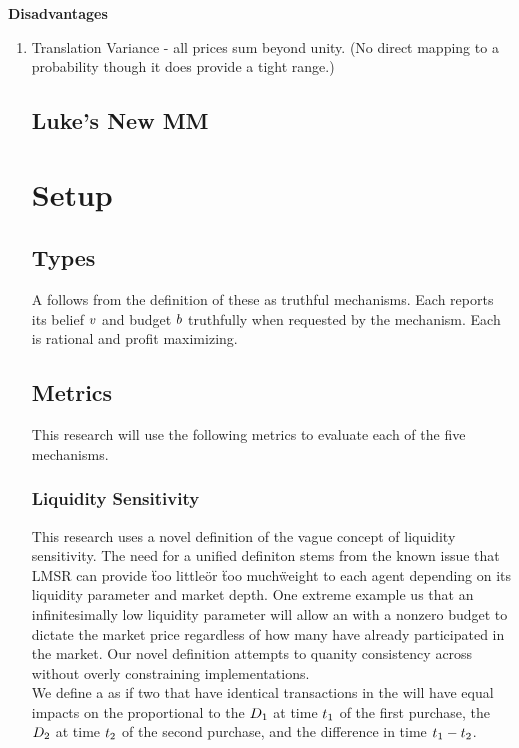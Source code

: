 \textbf{Disadvantages} \\
\begin{enumerate}
\item{Translation Variance - all prices sum beyond unity. (No direct mapping to a probability though it does provide a tight range.)}

\subsection{Luke's New MM}

\section{Setup}

\subsection{Types}
A  follows from the definition of these  as truthful
mechanisms. Each  reports its belief $v$ and budget $b$
truthfully when requested by the mechanism. Each  is rational and profit
maximizing.

\subsection{Metrics}
This research will use the following metrics to evaluate each of the five mechanisms.
\subsubsection{Liquidity Sensitivity}
This research uses a novel definition of the vague concept of liquidity sensitivity. The need
for a unified definiton stems from the known issue that LMSR can provide \"too little\" or 
\"too much\" weight to each agent depending on its liquidity parameter and market depth. One extreme
example us that an infinitesimally low liquidity parameter will allow an  with a nonzero
budget to dictate the market price regardless of how many  have already participated in
the market. Our novel definition attempts to quanity consistency across  without
overly constraining implementations. \\

We define a  as  if two  that have identical
transactions in the  will have equal impacts on the  proportional to 
the  $D_{1}$ at time $t_{1}$ of the first purchase, the  
$D_{2}$ at time $t_{2}$ of the second purchase, and the difference in time $t_{1} - t_{2}$.\\


\end{enumerate}
